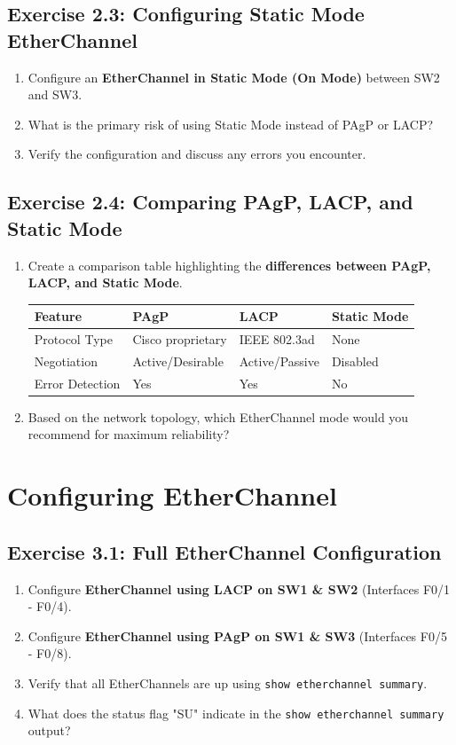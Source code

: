 \documentclass[a4paper]{article}
\begin{document}
\subsection{Exercise 2.3: Configuring Static Mode EtherChannel}
\begin{enumerate}
    \item Configure an \textbf{EtherChannel in Static Mode (On Mode)} between SW2 and SW3.
    \item What is the primary risk of using Static Mode instead of PAgP or LACP?
    \item Verify the configuration and discuss any errors you encounter.
\end{enumerate}

\subsection{Exercise 2.4: Comparing PAgP, LACP, and Static Mode}
\begin{enumerate}
    \item Create a comparison table highlighting the \textbf{differences between PAgP, LACP, and Static Mode}.
    
    \begin{tabular}{|l|l|l|l|}
        \hline
        Feature & PAgP & LACP & Static Mode \\
        \hline
        Protocol Type & Cisco proprietary & IEEE 802.3ad & None \\
        Negotiation & Active/Desirable & Active/Passive & Disabled \\
        Error Detection & Yes & Yes & No \\
        \hline
    \end{tabular}
    
    \item Based on the network topology, which EtherChannel mode would you recommend for maximum reliability?
\end{enumerate}

\section{Configuring EtherChannel}
\subsection{Exercise 3.1: Full EtherChannel Configuration}
\begin{enumerate}
    \item Configure \textbf{EtherChannel using LACP on SW1 \& SW2} (Interfaces F0/1 - F0/4).
    \item Configure \textbf{EtherChannel using PAgP on SW1 \& SW3} (Interfaces F0/5 - F0/8).
    \item Verify that all EtherChannels are up using \texttt{show etherchannel summary}.
    \item What does the status flag "SU" indicate in the \texttt{show etherchannel summary} output?
\end{enumerate}
\end{document}
